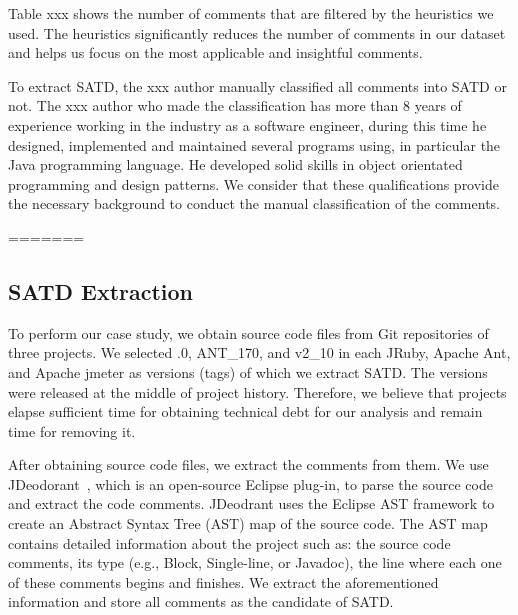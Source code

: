 \documentclass[conference]{IEEEtran}
\begin{document}
Table xxx shows the number of comments that are filtered by the heuristics we used. The heuristics significantly reduces the number of comments in our dataset and helps us focus on the most applicable and insightful comments. 


To extract SATD, the xxx author manually classified all comments into SATD or not.
The xxx author who made the classification has more than 8 years of experience working in the industry as a software engineer, during this time he designed, implemented and maintained several programs using, in particular the Java programming language. He developed solid skills in object orientated programming and design patterns. We consider that these qualifications provide the necessary background to conduct the manual classification of the comments.

=======


\subsection{SATD Extraction}
To perform our case study, we obtain source code files from Git repositories of three projects. We selected {.0}, {\sc ANT\_170}, and {\sc v2\_10} in each JRuby, Apache Ant, and Apache jmeter as versions (tags) of which we extract SATD. The versions were released at the middle of project history. Therefore, we believe that projects elapse sufficient time for obtaining technical debt for our analysis and remain time for removing it.

After obtaining source code files, we extract the comments from them. We use JDeodorant~\cite{Tsantalis2008CSMR}, which is an open-source Eclipse plug-in, to parse the source code and extract the code comments. JDeodrant uses the Eclipse AST framework to create an Abstract Syntax Tree (AST) map of the source code. The AST map contains detailed information about the project such as: the source code comments, its type (e.g., Block, Single-line, or Javadoc), the line where each one of these comments begins and finishes. We extract the aforementioned information and store all comments as the candidate of SATD.
\end{document}
